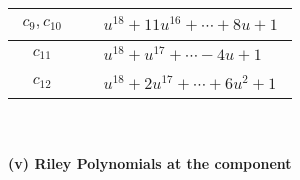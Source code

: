 \documentclass[1p]{elsarticle_modified}
\theoremstyle{definition}
\begin{document}
\begin{tabular}{m{50pt}|m{274pt}}
\hline $$\begin{aligned}c_{9},c_{10}\end{aligned}$$&$\begin{aligned}
&u^{18}+11 u^{16}+\cdots+8 u+1
\end{aligned}$\\
\hline $$\begin{aligned}c_{11}\end{aligned}$$&$\begin{aligned}
&u^{18}+u^{17}+\cdots-4 u+1
\end{aligned}$\\
\hline $$\begin{aligned}c_{12}\end{aligned}$$&$\begin{aligned}
&u^{18}+2 u^{17}+\cdots+6 u^2+1
\end{aligned}$\\
\hline
\end{tabular}\\~\\
\newpage\renewcommand{\arraystretch}{1}
\flushleft \textbf{(v) Riley Polynomials at the component}\newline \\
\end{document}
